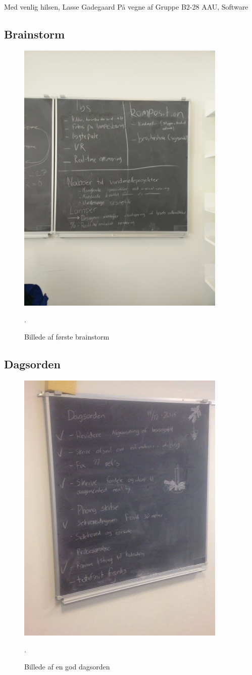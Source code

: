 \documentclass[oneside,a4paper,titlepage]{article}
\begin{document}
Med venlig hilsen,\newline
Lasse Gadegaard\newline
På vegne af\newline
Gruppe B2-28\newline
AAU, Software

\subsection{Brainstorm}
\begin{figure}[H]
   \centering
   \includegraphics[width=10cm]{./../graphics/brainstorm_1}
   \caption{Billede af første brainstorm}.
\end{figure}

\subsection{Dagsorden}
\begin{figure}[H]
   \centering
   \includegraphics[width=10cm]{./../graphics/dagsorden}
   \caption{Billede af en god dagsorden}.
   \label{fig:dagsorden}
\end{figure}
\end{document}
